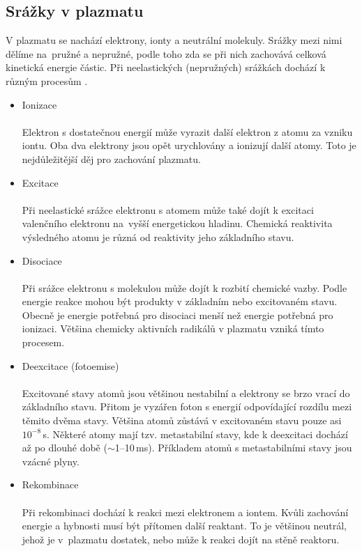 \documentclass[12pt,oneside,final]{fithesis2}
\begin{document}
\subsection {Srážky v plazmatu}
V plazmatu se nachází elektrony, ionty a neutrální molekuly. Srážky mezi nimi dělíme na~pružné a nepružné, podle toho zda se při nich zachovává celková kinetická energie částic. Při neelastických (nepružných) srážkách dochází k různým procesům \cite{chen2003reactions}. 

\begin{itemize}
  \item {Ionizace\\
	\\
	Elektron s dostatečnou energií může vyrazit další elektron z atomu za vzniku iontu. Oba dva elektrony jsou opět urychlovány a ionizují další atomy. Toto je nejdůležitější děj pro zachování plazmatu.  }
  \item{Excitace\\
	\\
	 Při neelastické srážce elektronu s atomem může také dojít k excitaci valenčního elektronu na~vyš\-ší energetickou hladinu. Chemická reaktivita výsledného atomu je různá od reaktivity jeho základního stavu.}
  \item{Disociace\\
	\\
	Při srážce elektronu s molekulou může dojít k rozbití chemické vazby. Podle energie reakce mohou být produkty v základním nebo excitovaném stavu. Obecně je energie potřebná pro disociaci menší než energie potřebná pro ionizaci. Většina chemicky aktivních radikálů v plazmatu vzniká tímto procesem.
 }
  \item{Deexcitace (fotoemise)\\
	\\
	Excitované stavy atomů jsou většinou nestabilní a elektrony se brzo vrací do základního stavu. Přitom je vyzářen foton s energií odpovídající rozdílu mezi těmito dvěma stavy. Většina atomů zůstává v excitovaném stavu pouze asi $10^{-8}$\,s. Některé atomy mají tzv. metastabilní stavy, kde k deexcitaci dochází až po dlouhé době ($\sim$1--10\,ms). Příkladem atomů s metastabilními stavy jsou vzácné plyny.}
  \item{Rekombinace\\
	\\
	Při rekombinaci dochází k reakci mezi elektronem a iontem. Kvůli zachování energie a hybnosti musí být přítomen další reaktant. To je většinou neutrál, jehož je v~plazmatu dostatek, nebo může k reakci dojít na stěně reaktoru.}

\end{itemize}
\end{document}
